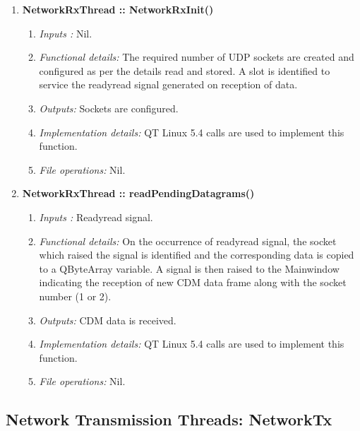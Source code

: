 \begin{enumerate}
\begin{enumerate}
	\item  \textbf{NetworkRxThread :: NetworkRxInit()}
	\begin{enumerate}
		\item \textit{Inputs :} Nil.
		\item \textit{Functional details:} The required number of UDP sockets are created and configured as per the details read and stored. A slot is identified to service the readyread signal generated on reception of data.
		\item \textit{Outputs:} Sockets are configured. 
		\item \textit{Implementation details:} QT Linux 5.4 calls are used to implement this function.
		\item \textit{File operations:} Nil.
	\end{enumerate}
	\item \textbf{NetworkRxThread :: readPendingDatagrams()}
	\begin{enumerate}
		\item \textit{Inputs :} Readyread signal.
		\item \textit{Functional details:} On the occurrence of readyread signal, the socket which raised the signal is identified and the corresponding data is copied to a QByteArray variable. A signal is then raised to the Mainwindow indicating the reception of new CDM data frame along with the socket number (1 or 2).
		\item \textit{Outputs:} CDM data is received.
		\item \textit{Implementation details:} QT Linux 5.4 calls are used to implement this function.
		\item \textit{File operations:} Nil.
	\end{enumerate}   
\end{enumerate}





\subsection{Network Transmission Threads: NetworkTx }


\end{enumerate}
